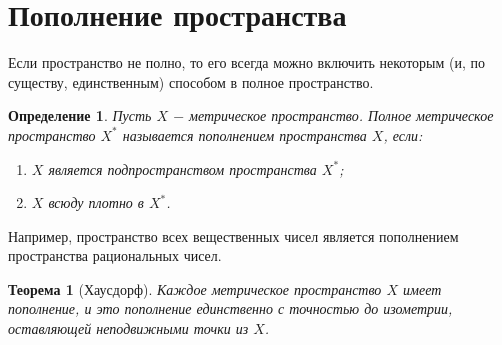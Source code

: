 \documentclass{article}
\newtheorem{theorem}{Теорема}[section]
\newtheorem{definition}{Определение}[section]
\begin{document}
\section{Пополнение пространства}

Если пространство не полно, то его всегда можно включить некоторым (и, по существу, единственным) способом в полное пространство.

\begin{definition}
Пусть \(X\) \(-\) метрическое пространство. Полное метрическое пространство \(X^*\) называется пополнением пространства \(X\), если:
\begin{enumerate}
 \item \(X\) является подпространством пространства \(X^*\);
 \item \(X\) всюду плотно в \(X^*\).
\end{enumerate}
\end{definition}

Например, пространство всех вещественных чисел является пополнением пространства рациональных чисел.

\begin{theorem}[Хаусдорф]
Каждое метрическое пространство \(X\) имеет пополнение, и это пополнение единственно с точностью до изометрии, оставляющей неподвижными точки из \(X\).
\end{theorem}
\end{document}
